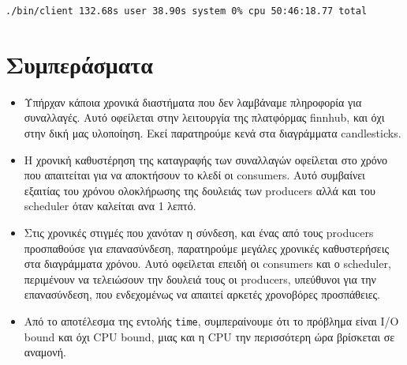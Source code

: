 \documentclass[12pt, a4paper]{article}
\begin{document}
\verb|./bin/client 132.68s user 38.90s system 0% cpu 50:46:18.77 total|


\section{Συμπεράσματα}

\begin{itemize}
\itemsep 0em
\item Υπήρχαν κάποια χρονικά διαστήματα που δεν λαμβάναμε πληροφορία για συναλλαγές. Αυτό οφείλεται στην λειτουργία της πλατφόρμας finnhub, και όχι στην δική μας υλοποίηση. Εκεί παρατηρούμε κενά στα διαγράμματα candlesticks.
\item Η χρονική καθυστέρηση της καταγραφής των συναλλαγών οφείλεται στο χρόνο που απαιτείται για να αποκτήσουν το κλεδί οι consumers. Αυτό συμβαίνει εξαιτίας του χρόνου ολοκλήρωσης της δουλειάς των producers αλλά και του scheduler όταν καλείται ανα 1 λεπτό.
\item Στις χρονικές στιγμές που χανόταν η σύνδεση, και ένας από τους producers προσπαθούσε για επανασύνδεση, παρατηρούμε μεγάλες χρονικές καθυστερήσεις στα διαγράμματα χρόνου. Αυτό οφείλεται επειδή οι consumers και ο scheduler, περιμένουν να τελειώσουν την δουλειά τους οι producers, υπεύθυνοι για την επανασύνδεση, που ενδεχομένως να απαιτεί αρκετές χρονοβόρες προσπάθειες.
\item Από το αποτέλεσμα της εντολής \verb|time|, συμπεραίνουμε ότι το πρόβλημα είναι I/O bound και όχι CPU bound, μιας και η CPU την περισσότερη ώρα βρίσκεται σε αναμονή.
\end{itemize}
\end{document}
